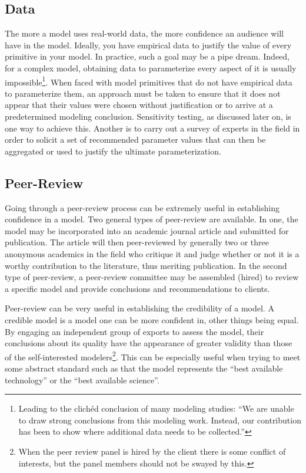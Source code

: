 \documentclass[]{memoir}
\begin{document}
\subsection{Data}

The more a model uses real-world data, the more confidence an audience
will have in the model. Ideally, you have empirical data to justify the
value of every primitive in your model. In practice, such a goal may be
a pipe dream. Indeed, for a complex model, obtaining data to
parameterize every aspect of it is usually impossible\footnote{Leading
  to the clichéd conclusion of many modeling studies: ``We are unable to
  draw strong conclusions from this modeling work. Instead, our
  contribution has been to show where additional data needs to be
  collected.''}. When faced with model primitives that do not have
empirical data to parameterize them, an approach must be taken to ensure
that it does not appear that their values were chosen without
justification or to arrive at a predetermined modeling conclusion.
Sensitivity testing, as discussed later on, is one way to achieve this.
Another is to carry out a survey of experts in the field in order to
solicit a set of recommended parameter values that can then be
aggregated or used to justify the ultimate parameterization.

\subsection{Peer-Review}

Going through a peer-review process can be extremely useful in
establishing confidence in a model. Two general types of peer-review are
available. In one, the model may be incorporated into an academic
journal article and submitted for publication. The article will then
peer-reviewed by generally two or three anonymous academics in the field
who critique it and judge whether or not it is a worthy contribution to
the literature, thus meriting publication. In the second type of
peer-review, a peer-review committee may be assembled (hired) to review
a specific model and provide conclusions and recommendations to clients.

Peer-review can be very useful in establishing the credibility of a
model. A credible model is a model one can be more confident in, other
things being equal. By engaging an independent group of exports to
assess the model, their conclusions about its quality have the
appearance of greater validity than those of the self-interested
modelers\footnote{When the peer review panel is hired by the client
  there is some conflict of interests, but the panel members should not
  be swayed by this.}. This can be especially useful when trying to meet
some abstract standard such as that the model represents the ``best
available technology'' or the ``best available science''.
\end{document}
